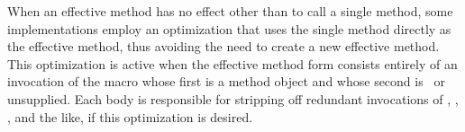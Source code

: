 When an effective method has no effect other than to call a single
method, some implementations employ an optimization that uses the
single method directly as the effective method, thus avoiding the need
to create a new effective method.  This optimization is active when
the effective method form consists entirely of an invocation of
the  macro whose first  is a method object and
whose second  is \nil\ or unsupplied.  Each
 body is responsible for stripping off
redundant invocations of , ,
, and the like, if this optimization is desired.
 
 
 
